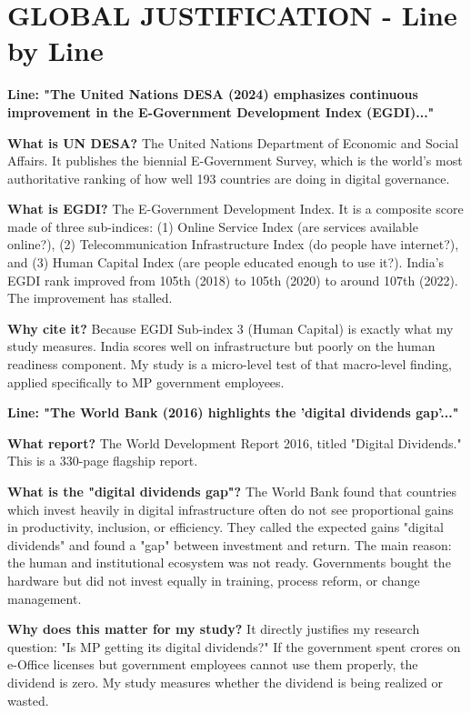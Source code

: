 \documentclass[11pt,a4paper]{article}
\begin{document}
\section{GLOBAL JUSTIFICATION - Line by Line}

\textbf{Line: "The United Nations DESA (2024) emphasizes continuous improvement in the E-Government Development Index (EGDI)..."}

\begin{abox}
\textbf{What is UN DESA?} The United Nations Department of Economic and Social Affairs. It publishes the biennial E-Government Survey, which is the world's most authoritative ranking of how well 193 countries are doing in digital governance.

\textbf{What is EGDI?} The E-Government Development Index. It is a composite score made of three sub-indices: (1) Online Service Index (are services available online?), (2) Telecommunication Infrastructure Index (do people have internet?), and (3) Human Capital Index (are people educated enough to use it?). India's EGDI rank improved from 105th (2018) to 105th (2020) to around 107th (2022). The improvement has stalled.

\textbf{Why cite it?} Because EGDI Sub-index 3 (Human Capital) is exactly what my study measures. India scores well on infrastructure but poorly on the human readiness component. My study is a micro-level test of that macro-level finding, applied specifically to MP government employees.
\end{abox}

\textbf{Line: "The World Bank (2016) highlights the 'digital dividends gap'..."}

\begin{abox}
\textbf{What report?} The World Development Report 2016, titled "Digital Dividends." This is a 330-page flagship report.

\textbf{What is the "digital dividends gap"?} The World Bank found that countries which invest heavily in digital infrastructure often do not see proportional gains in productivity, inclusion, or efficiency. They called the expected gains "digital dividends" and found a "gap" between investment and return. The main reason: the human and institutional ecosystem was not ready. Governments bought the hardware but did not invest equally in training, process reform, or change management.

\textbf{Why does this matter for my study?} It directly justifies my research question: "Is MP getting its digital dividends?" If the government spent crores on e-Office licenses but government employees cannot use them properly, the dividend is zero. My study measures whether the dividend is being realized or wasted.
\end{abox}
\end{document}
